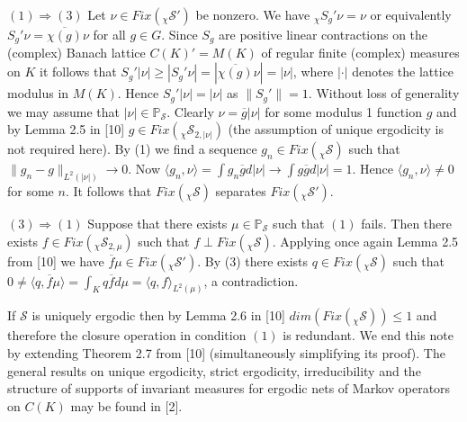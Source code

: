 \documentclass{amsart}
\theoremstyle{definition}
\theoremstyle{remark}
\numberwithin{equation}{section}
\newcommand{\bs}{\rightline{$\blacksquare$}}
\begin{document}
$(1) \Rightarrow (3)$ Let $\nu \in Fix(_{\chi}\mathcal{S}')$ be nonzero. We have  $_{\chi}S_g'\nu = \nu $ or equivalently $S_g'\nu = \overline{\chi (g)}\nu$ for all $g\in G$.
Since $S_g$ are positive linear contractions on the (complex) Banach lattice $C(K)' = M(K)$ of regular finite (complex) measures on $K$ it follows that $S_g'|\nu | \geq |S_g'\nu | = |\overline{\chi(g)}\nu | = |\nu |$, where $|\cdot |$ denotes the lattice modulus in $M(K)$. Hence $S_g'|\nu | = |\nu |$ as $\| S_g' \| = 1$. Without loss of generality we may assume that $|\nu | \in \mathbb{P}_{\mathcal{S}}$. Clearly $\nu = \overline{g}|\nu |$ for some modulus 1 function $g$ and by Lemma 2.5 in [10] $g\in Fix(_{\chi}\mathcal{S}_{2,|\nu |})$ (the assumption of unique ergodicity is not required here). By (1) we find a sequence $g_n \in Fix(_{\chi}\mathcal{S})$ such that $\| g_n - g \|_{L^2(| \nu |)} \to 0$. Now $\langle g_n , \nu \rangle  = \int g_n\overline{g}d|\nu | \to \int g\overline{g}d|\nu | = 1$. Hence $ \langle g_n , \nu \rangle  \neq 0$ for some $n$. It follows that  $Fix(\mathcal{_{\chi}S})$ separates $Fix(_{\chi}\mathcal{S}')$.

$(3) \Rightarrow (1)$ Suppose that there exists $\mu \in \mathbb{P}_{\mathcal{S}}$ such that $(1)$ fails. Then there exists $f\in Fix(_{\chi}\mathcal{S}_{2,\mu })$ such that $f \perp Fix(_{\chi}\mathcal{S})$. Applying once again Lemma 2.5 from [10] we have $\overline{f}\mu \in Fix(_{\chi}\mathcal{S}')$. By (3) there exists $q \in Fix(_{\chi}\mathcal{S})$ such that $0 \neq \langle q, \overline{f}\mu \rangle = \int_K q\overline{f}d\mu = \langle q , f \rangle_{L^2(\mu)}$, a contradiction.

\bs

If $\mathcal{S}$ is uniquely ergodic then by Lemma 2.6 in [10] $dim (Fix(_{\chi}\mathcal{S})) \leq 1 $ and therefore the closure operation in condition $(1)$ is redundant. We end this note by extending Theorem 2.7 from [10] (simultaneously simplifying its proof). The general results on unique ergodicity, strict ergodicity, irreducibility and the structure of supports of invariant measures for ergodic nets of Markov operators on $C(K)$ may be found in [2].
\end{document}
